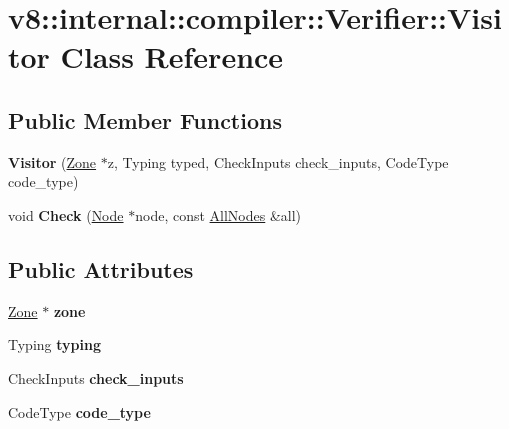 \hypertarget{classv8_1_1internal_1_1compiler_1_1Verifier_1_1Visitor}{}\section{v8\+:\+:internal\+:\+:compiler\+:\+:Verifier\+:\+:Visitor Class Reference}
\label{classv8_1_1internal_1_1compiler_1_1Verifier_1_1Visitor}
\subsection*{Public Member Functions}
\begin{DoxyCompactItemize}
\item 
\mbox{\label{classv8_1_1internal_1_1compiler_1_1Verifier_1_1Visitor_a28aa6de3bd7b1bee5b84c752822f877a}} 
{\bfseries Visitor} (\mbox{\hyperlink{classv8_1_1internal_1_1Zone}{Zone}} $\ast$z, Typing typed, Check\+Inputs check\+\_\+inputs, Code\+Type code\+\_\+type)
\item 
\mbox{\label{classv8_1_1internal_1_1compiler_1_1Verifier_1_1Visitor_a45aca7788e47546873b46e5763ed1de3}} 
void {\bfseries Check} (\mbox{\hyperlink{classv8_1_1internal_1_1compiler_1_1Node}{Node}} $\ast$node, const \mbox{\hyperlink{classv8_1_1internal_1_1compiler_1_1AllNodes}{All\+Nodes}} \&all)
\end{DoxyCompactItemize}
\subsection*{Public Attributes}
\begin{DoxyCompactItemize}
\item 
\mbox{\label{classv8_1_1internal_1_1compiler_1_1Verifier_1_1Visitor_a360d0d62b24bb7179d892e8913cce9ab}} 
\mbox{\hyperlink{classv8_1_1internal_1_1Zone}{Zone}} $\ast$ {\bfseries zone}
\item 
\mbox{\label{classv8_1_1internal_1_1compiler_1_1Verifier_1_1Visitor_a19cd8d4aab6da178273eea75afa0fc3c}} 
Typing {\bfseries typing}
\item 
\mbox{\label{classv8_1_1internal_1_1compiler_1_1Verifier_1_1Visitor_afb448703175b0d1d99c57baba6627f9e}} 
Check\+Inputs {\bfseries check\+\_\+inputs}
\item 
\mbox{\label{classv8_1_1internal_1_1compiler_1_1Verifier_1_1Visitor_a93b5a6280b412ca416ff28dca87c4408}} 
Code\+Type {\bfseries code\+\_\+type}
\end{DoxyCompactItemize}


